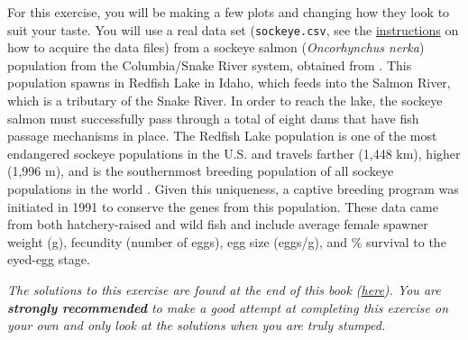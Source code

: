\documentclass[]{book}
\begin{document}
For this exercise, you will be making a few plots and changing how they look to suit your taste. You will use a real data set (\texttt{sockeye.csv}, see the \protect\hyperlink{data-sets}{instructions} on how to acquire the data files) from a sockeye salmon (\emph{Oncorhynchus nerka}) population from the Columbia/Snake River system, obtained from \citet{sockeye-cite}. This population spawns in Redfish Lake in Idaho, which feeds into the Salmon River, which is a tributary of the Snake River. In order to reach the lake, the sockeye salmon must successfully pass through a total of eight dams that have fish passage mechanisms in place. The Redfish Lake population is one of the most endangered sockeye populations in the U.S. and travels farther (1,448 km), higher (1,996 m), and is the southernmost breeding population of all sockeye populations in the world \citep{sockeye-cite}. Given this uniqueness, a captive breeding program was initiated in 1991 to conserve the genes from this population. These data came from both hatchery-raised and wild fish and include average female spawner weight (g), fecundity (number of eggs), egg size (eggs/g), and \% survival to the eyed-egg stage.

\emph{The solutions to this exercise are found at the end of this book (\protect\hyperlink{ex2-answers}{here}). You are \textbf{strongly recommended} to make a good attempt at completing this exercise on your own and only look at the solutions when you are truly stumped.}
\end{document}
